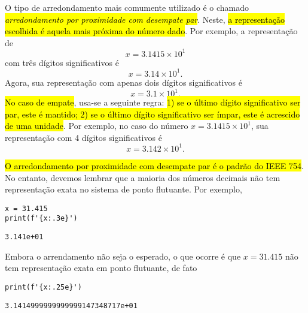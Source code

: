 O tipo de arredondamento mais comumente utilizado é o chamado \hl{\emph{arredondamento por proximidade com desempate par}}. Neste, \hl{a representação escolhida é aquela mais próxima do número dado}. Por exemplo, a representação de 
\begin{equation}
  x=3.1415\times 10^1
\end{equation}
com três dígitos significativos é 
\begin{equation}
  x=3.14\times 10^{1}. 
\end{equation}
Agora, sua representação com apenas dois dígitos significativos é
\begin{equation}
  x=3.1\times 10^{1}.
\end{equation}
\hl{No caso de empate}, usa-se a seguinte regra: \hl{1) se o último dígito significativo ser par, este é mantido; 2) se o último dígito significativo ser ímpar, este é acrescido de uma unidade}. Por exemplo, no caso do número $x=3.1415\times 10^1$, sua representação com 4 dígitos significativos é
\begin{equation}
  x = 3.142\times 10^1.
\end{equation}

\begin{obs}\label{obs:arredondamento_ieee754}
  \hl{O arredondamento por proximidade com desempate par é o padrão do IEEE 754}. No entanto, devemos lembrar que a maioria dos números decimais não tem representação exata no sistema de ponto flutuante. Por exemplo,

\begin{lstlisting}
x = 31.415
print(f'{x:.3e}')
\end{lstlisting}

\begin{verbatim}
3.141e+01
\end{verbatim}

  Embora o arrendamento não seja o esperado, o que ocorre é que $x = 31.415$ não tem representação exata em ponto flutuante, de fato

\begin{lstlisting}
print(f'{x:.25e}')
\end{lstlisting}

\begin{verbatim}
3.1414999999999999147348717e+01
\end{verbatim}
\end{obs}

